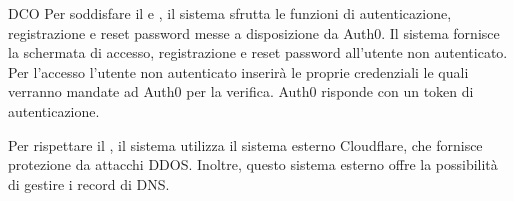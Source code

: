 \begin{listaPersonale}{DCO}
    Per soddisfare il  e , il sistema sfrutta le funzioni di autenticazione, registrazione e reset password messe a disposizione da Auth0. Il sistema fornisce la schermata di accesso, registrazione e reset password all'utente non autenticato. Per l'accesso l'utente non autenticato inserirà le proprie credenziali le quali verranno mandate ad Auth0 per la verifica. Auth0 risponde con un token di autenticazione.

    Per rispettare il , il sistema utilizza il sistema esterno Cloudflare, che fornisce protezione da attacchi DDOS. Inoltre, questo sistema esterno offre la possibilità di gestire i record di DNS.


\end{listaPersonale}
